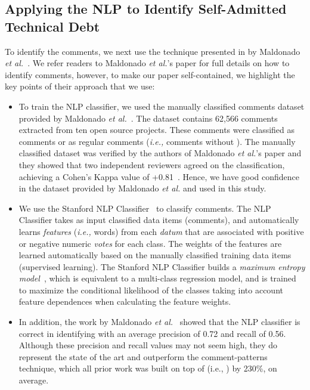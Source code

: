 \subsection{Applying the NLP to Identify Self-Admitted Technical Debt} 
To identify the \SATD comments, we next use the technique presented in by Maldonado \emph{et al.}~\cite{Maldonado2015TSE}. We refer readers to Maldonado \emph{et al.}'s paper for full details on how to identify \SATD comments, however, to make our paper self-contained, we highlight the key points of their approach that we use:

\begin{itemize}
	\item To train the NLP classifier, we used the manually classified \SATD comments dataset provided by Maldonado \emph{et al.}~\cite{Maldonado2015TSE}. The dataset contains 62,566 comments extracted from ten open source projects. These comments were classified as \SATD comments or as regular comments (\textit{i.e.,} comments without \SATD). The manually classified dataset was verified by the authors of Maldonado \emph{et al.}'s paper and they showed that two independent reviewers agreed on the classification, achieving a Cohen's Kappa value of +0.81~\cite{Maldonado2015TSE}. Hence, we have good confidence in the dataset provided by Maldonado \emph{et al.} and used in this study.
	
	\item We use the Stanford NLP Classifier~\cite{Manning2014ACL} to classify \SATD comments.
	The NLP Classifier takes as input classified data items (comments), and automatically learns \textit{features} (\textit{i.e.,} words) from each \textit{datum} that are associated with positive or negative numeric \textit{votes} for each class. The weights of the features are learned automatically based on the manually classified training data items (supervised learning). The Stanford NLP Classifier builds a \textit{maximum entropy model}~\cite{nigam1999using}, which is equivalent to a multi-class regression model, and is trained to maximize the conditional likelihood of the classes taking into account feature dependences when calculating the feature weights.
	
	\item In addition, the work by Maldonado \emph{et al.}~\cite{Maldonado2015TSE} showed that the NLP classifier is correct in identifying \SATD with an average precision of 0.72 and recall of 0.56. Although these precision and recall values may not seem high, they do represent the state of the art and outperform the comment-patterns technique, which all prior work was built on top of (i.e., \cite{Wehaibi2016SANER,Bavota2016MSR,Potdar2014ICSME}) by 230\%, on average. 
\end{itemize}

